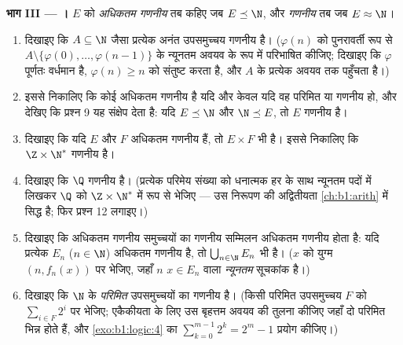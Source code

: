 \begin{problem}
\medskip \noindent\textbf{भाग III --- ।}  $E$ को
\emph{अधिकतम गणनीय} तब कहिए जब $E \preceq \N$, और \emph{गणनीय} तब जब $E
\approx \N$।
\begin{enumerate}[resume]
  \item दिखाइए कि $A \subseteq \N$ जैसा प्रत्येक अनंत उपसमुच्चय गणनीय है।
  ($\varphi(n)$ को पुनरावर्ती रूप से $A \setminus \{\varphi(0), \dots,
  \varphi(n-1)\}$ के न्यूनतम अवयव के रूप में परिभाषित कीजिए; दिखाइए कि
  $\varphi$ पूर्णतः वर्धमान है, $\varphi(n) \geq n$ को संतुष्ट करता है, और
  $A$ के प्रत्येक अवयव तक पहुँचता है।)
  \item इससे निकालिए कि कोई  अधिकतम गणनीय है यदि और केवल यदि वह
  परिमित या गणनीय हो, और देखिए कि प्रश्न 9 यह संक्षेप देता है: यदि $E
  \preceq \N$ और $\N \preceq E$, तो $E$ गणनीय है।
  \item दिखाइए कि यदि $E$ और $F$ अधिकतम गणनीय हैं, तो $E \times F$ भी है।
  इससे निकालिए कि $\Z \times \N^*$ गणनीय है।
  \item दिखाइए कि $\Q$ गणनीय है। (प्रत्येक परिमेय संख्या को धनात्मक हर के
  साथ न्यूनतम पदों में लिखकर $\Q$ को $\Z \times \N^*$ में  रूप से भेजिए
  --- उस निरूपण की अद्वितीयता \cref{ch:b1:arith} में सिद्ध है; फिर प्रश्न 12
  लगाइए।)
  \item दिखाइए कि अधिकतम गणनीय समुच्चयों का गणनीय सम्मिलन अधिकतम गणनीय होता
  है: यदि प्रत्येक $E_n$ ($n \in \N$) अधिकतम गणनीय है, तो $\bigcup_{n \in
  \N} E_n$ भी है। ($x$ को युग्म $(n, f_n(x))$ पर भेजिए, जहाँ $n$ $x \in E_n$
  वाला \emph{न्यूनतम} सूचकांक है।)
  \item दिखाइए कि $\N$ के \emph{परिमित} उपसमुच्चयों का  गणनीय है।
  (किसी परिमित उपसमुच्चय $F$ को $\sum_{i \in F} 2^i$ पर भेजिए; एकैकीयता के
  लिए उस बृहत्तम अवयव की तुलना कीजिए जहाँ दो परिमित  भिन्न होते हैं,
  और \cref{exo:b1:logic:4} का $\sum_{k=0}^{m-1} 2^k = 2^m - 1$ प्रयोग
  कीजिए।)
\end{enumerate}


\end{problem}
